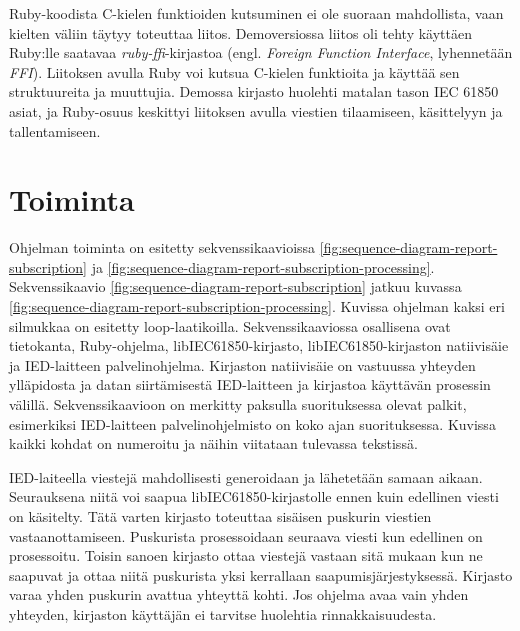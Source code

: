 Ruby-koodista C-kielen funktioiden kutsuminen ei ole suoraan mahdollista, vaan kielten väliin täytyy toteuttaa liitos. Demoversiossa liitos oli tehty käyttäen Ruby:lle saatavaa \emph{ruby-ffi}-kirjastoa \cite{ruby-ffi-repo} (engl. \emph{Foreign Function Interface}, lyhennetään \emph{FFI}). Liitoksen avulla Ruby voi kutsua C-kielen funktioita ja käyttää sen struktuureita ja muuttujia. Demossa kirjasto huolehti matalan tason IEC 61850 asiat, ja Ruby-osuus keskittyi liitoksen avulla viestien tilaamiseen, käsittelyyn ja tallentamiseen.


\section{Toiminta}
\label{ch:ongelmakohdat-ja-analysointi}
Ohjelman toiminta on esitetty sekvenssikaavioissa \ref{fig:sequence-diagram-report-subscription} ja \ref{fig:sequence-diagram-report-subscription-processing}. Sekvenssikaavio \ref{fig:sequence-diagram-report-subscription} jatkuu kuvassa \ref{fig:sequence-diagram-report-subscription-processing}. Kuvissa ohjelman kaksi eri silmukkaa on esitetty loop-laatikoilla. Sekvenssikaaviossa osallisena ovat tietokanta, Ruby-ohjelma, libIEC61850-kirjasto, libIEC61850-kirjaston natiivisäie ja IED-laitteen palvelinohjelma. Kirjaston natiivisäie on vastuussa yhteyden ylläpidosta ja datan siirtämisestä IED-laitteen ja kirjastoa käyttävän prosessin välillä. Sekvenssikaavioon on merkitty paksulla suorituksessa olevat palkit, esimerkiksi IED-laitteen palvelinohjelmisto on koko ajan suorituksessa. Kuvissa kaikki kohdat on numeroitu ja näihin viitataan tulevassa tekstissä.

IED-laiteella viestejä mahdollisesti generoidaan ja lähetetään samaan aikaan. Seurauksena niitä voi saapua libIEC61850-kirjastolle ennen kuin edellinen viesti on käsitelty. Tätä varten kirjasto toteuttaa sisäisen puskurin viestien vastaanottamiseen. Puskurista prosessoidaan seuraava viesti kun edellinen on prosessoitu. Toisin sanoen kirjasto ottaa viestejä vastaan sitä mukaan kun ne saapuvat ja ottaa niitä puskurista yksi kerrallaan saapumisjärjestyksessä. Kirjasto varaa yhden puskurin avattua yhteyttä kohti. Jos ohjelma avaa vain yhden yhteyden, kirjaston käyttäjän ei tarvitse huolehtia rinnakkaisuudesta. \cite{libIEC61850-repo}

